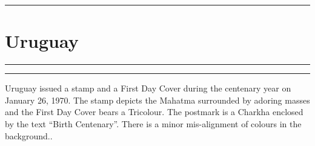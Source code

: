 \documentclass[a4paper]{article}
\begin{document}
  \hrule
\section*{Uruguay}
\vspace{8pt}
\hrule
\vspace{12cm}
\hfill
\begin{minipage}{6cm} \hrule \vspace{12pt} Uruguay issued a stamp and
  a First Day Cover during the centenary year on January 26, 1970. The
  stamp depicts the Mahatma surrounded by adoring masses and the First
  Day Cover bears a Tricolour. The postmark is a Charkha enclosed by
  the text ``Birth Centenary''. There is a minor mis-alignment of
  colours in the background..
\end{minipage}

\end{document}
